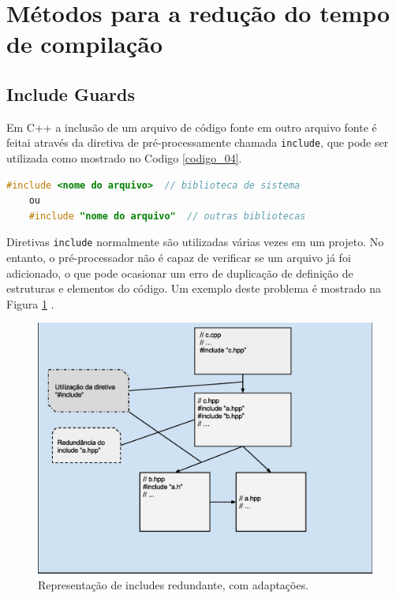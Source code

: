 \section{Métodos para a redução do tempo de compilação}

\subsection{Include Guards}

Em C++ a inclusão de um arquivo de código fonte em outro arquivo fonte é feitai
 através da diretiva de pré-processamente chamada \texttt{include}, que pode 
ser utilizada como mostrado no Codigo \ref{codigo_04}. 

\begin{lstlisting}[language=C++,frame=single,title={Código 4: Diretiva de 
                           pré-processamento para inclusão de um arquivo},
                                                   label=codigo_04]
    #include <nome do arquivo>  // biblioteca de sistema 
    ou
    #include "nome do arquivo"  // outras bibliotecas 


\end{lstlisting}


Diretivas \texttt{include} normalmente são utilizadas várias vezes em um projeto.
 No entanto, o pré-processador não é capaz de verificar se um arquivo já foi
 adicionado, o que pode ocasionar um erro de duplicação de definição de
 estruturas e elementos do código. Um exemplo deste problema é mostrado na
 Figura \ref{fig07} \cite{ref41}.


\begin{figure}[h]
    \centering
    \label{fig07}
        \includegraphics[keepaspectratio=true,scale=0.5]{figuras/multi_include.eps}
    \caption{ Representação de includes redundante, com adaptações\cite{ref42}.}
\end{figure}


